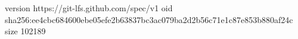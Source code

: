 version https://git-lfs.github.com/spec/v1
oid sha256:ee4cbc684600ebe05efe2b63837bc3ac079ba2d2b56c71e1c87e853b880af24c
size 102189
